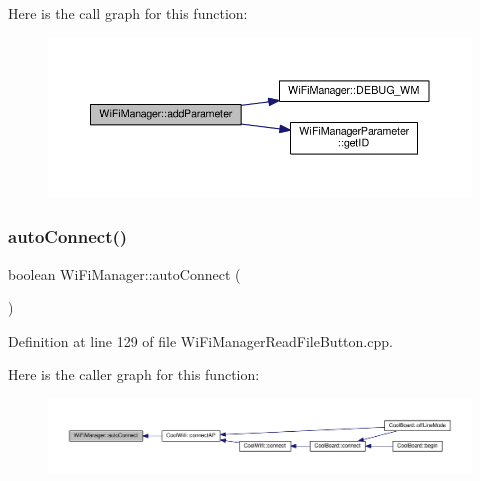 Here is the call graph for this function\+:\nopagebreak
\begin{figure}[H]
\begin{center}
\leavevmode
\includegraphics[width=350pt]{class_wi_fi_manager_a62907428e5874de097d83c33ef46c80d_cgraph}
\end{center}
\end{figure}
\mbox{\label{class_wi_fi_manager_ae3cdfa6b02edcfe63d7da4f696b62136}} 
\subsubsection{\texorpdfstring{auto\+Connect()}{autoConnect()}\hspace{0.1cm}{\footnotesize\ttfamily [1/2]}}
{\footnotesize\ttfamily boolean Wi\+Fi\+Manager\+::auto\+Connect (\begin{DoxyParamCaption}{ }\end{DoxyParamCaption})}



Definition at line 129 of file Wi\+Fi\+Manager\+Read\+File\+Button.\+cpp.

Here is the caller graph for this function\+:\nopagebreak
\begin{figure}[H]
\begin{center}
\leavevmode
\includegraphics[width=350pt]{class_wi_fi_manager_ae3cdfa6b02edcfe63d7da4f696b62136_icgraph}
\end{center}
\end{figure}
\mbox{\label{class_wi_fi_manager_ab1d094034e5e3e36e2e1b3624edad469}} 
